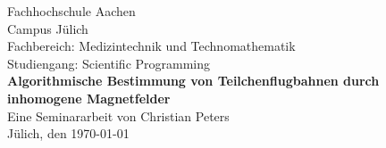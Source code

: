 \begin{titlepage}
  \begin{center}
    \LARGE{Fachhochschule Aachen\\}
    \Large{Campus J\"ulich\\}
    \vspace{2cm}
    \Large{Fachbereich: Medizintechnik und Technomathematik\\}
    \Large{Studiengang: Scientific Programming\\}
    \vspace{3cm}
    \LARGE{\textbf{Algorithmische Bestimmung von Teilchenflugbahnen durch
        inhomogene Magnetfelder\\}}
    \vspace{3cm}
    \Large{Eine Seminararbeit von Christian Peters\\}
    \vspace{2cm}
    \Large{J\"ulich, den \today}
  \end{center}
\end{titlepage}
